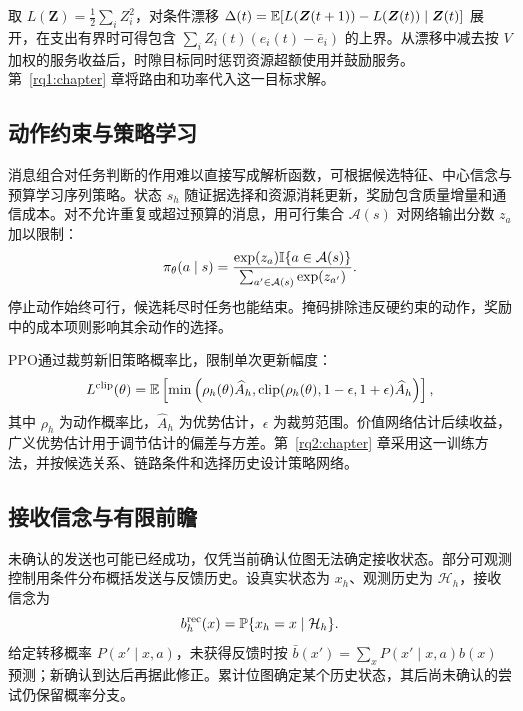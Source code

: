 取 $L(\bm Z)=\frac12\sum_iZ_i^2$，对条件漂移 $\Delta(t)=\mathbb{E}[L(\bm Z(t+1))-L(\bm Z(t))\mid\bm Z(t)]$ 展开，在支出有界时可得包含 $\sum_iZ_i(t)(e_i(t)-\bar e_i)$ 的上界。从漂移中减去按 $V$ 加权的服务收益后，时隙目标同时惩罚资源超额使用并鼓励服务。第~\ref{rq1:chapter} 章将路由和功率代入这一目标求解。

\subsection{动作约束与策略学习}

消息组合对任务判断的作用难以直接写成解析函数，可根据候选特征、中心信念与预算学习序列策略。状态 $s_h$ 随证据选择和资源消耗更新，奖励包含质量增量和通信成本。对不允许重复或超过预算的消息，用可行集合 $\mathcal A(s)$ 对网络输出分数 $z_a$ 加以限制：
\begin{equation}
\pi_\theta(a\mid s)=
\frac{\exp(z_a)\mathbb{I}\{a\in\mathcal A(s)\}}
{\sum_{a'\in\mathcal A(s)}\exp(z_{a'})}.
\label{eq:base:masked-policy}
\end{equation}
停止动作始终可行，候选耗尽时任务也能结束。掩码排除违反硬约束的动作，奖励中的成本项则影响其余动作的选择。

PPO通过裁剪新旧策略概率比，限制单次更新幅度\cite{ppo}：
\begin{equation}
L^{\rm clip}(\theta)=\mathbb{E}\left[
\min\left(\rho_h(\theta)\widehat A_h,
\operatorname{clip}(\rho_h(\theta),1-\epsilon,1+\epsilon)\widehat A_h\right)\right],
\label{eq:base:ppo}
\end{equation}
其中 $\rho_h$ 为动作概率比，$\widehat A_h$ 为优势估计，$\epsilon$ 为裁剪范围。价值网络估计后续收益，广义优势估计用于调节估计的偏差与方差\cite{gae}。第~\ref{rq2:chapter} 章采用这一训练方法，并按候选关系、链路条件和选择历史设计策略网络。

\subsection{接收信念与有限前瞻}

未确认的发送也可能已经成功，仅凭当前确认位图无法确定接收状态。部分可观测控制用条件分布概括发送与反馈历史\cite{kaelbling1998pomdp}。设真实状态为 $x_h$、观测历史为 $\mathcal H_h$，接收信念为
\begin{equation}
b^{\rm rec}_h(x)=\mathbb{P}\{x_h=x\mid\mathcal H_h\}.
\label{eq:base:reception-belief}
\end{equation}
给定转移概率 $P(x'\mid x,a)$，未获得反馈时按 $\bar b(x')=\sum_xP(x'\mid x,a)b(x)$ 预测；新确认到达后再据此修正。累计位图确定某个历史状态，其后尚未确认的尝试仍保留概率分支。

